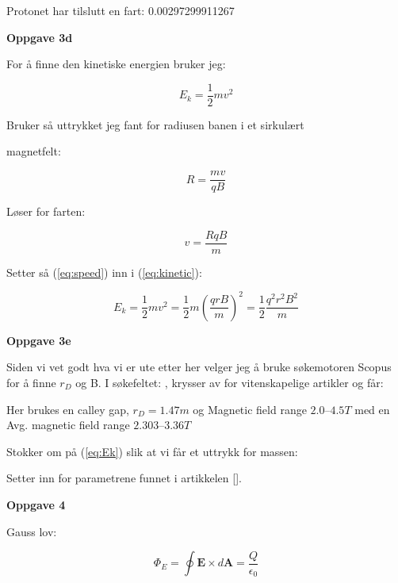 \documentclass[a4paper,norsk,12pt]{article}
\begin{document}
Protonet har tilslutt en fart:  0.00297299911267

\hspace{1cm}

\textbf{Oppgave 3d}

For å finne den kinetiske energien bruker jeg:


\begin{equation}
\label{eq:kinetic}
{ E_k = \dfrac{1}{2} m v^2 }
\end{equation}

Bruker så uttrykket jeg fant for radiusen banen i et sirkulært 

magnetfelt:

$$ R = \dfrac{m v}{q B} $$ 

Løser for farten:

\begin{equation}
\label{eq:speed}
{v = \dfrac{R q B}{m}} 
\end{equation}


Setter så (\ref{eq:speed}) inn i (\ref{eq:kinetic}):

\begin{equation}
\label{eq:Ek}
{ E_k = \dfrac{1}{2} m v^2 } =  \dfrac{1}{2} m (\dfrac{q r B}{m})^2  =  \dfrac{1}{2} \dfrac{q^2 r^2 B^2}{m} 
\end{equation}

\hspace{1cm}

\textbf{Oppgave 3e}

Siden vi vet godt hva vi er ute etter her velger jeg å bruke søkemotoren Scopus for å finne $r_D$ og B. I søkefeltet: , krysser av for vitenskapelige artikler og får:


Her brukes en calley gap, $r_D = 1.47 m$  og Magnetic field range $2.0–4.5 T$ med en Avg. magnetic field range $2.303–3.36 T$

Stokker om på (\ref{eq:Ek}) slik at vi får et uttrykk for massen:


Setter inn for parametrene funnet i artikkelen [].



\hspace{1cm}



\hspace{1cm}

\textbf{Oppgave 4}

Gauss lov:

$$ \Phi_E = \oint \textbf{E} \times d \textbf{A} = \dfrac{Q}{\epsilon_0}$$
\end{document}
